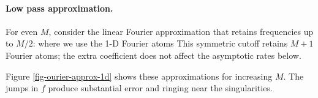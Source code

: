   
\paragraph{Low pass approximation.}

For even $M$, consider the linear Fourier approximation that retains frequencies up to $M/2$:
where we use the 1-D Fourier atoms
This symmetric cutoff retains $M+1$ Fourier atoms; the extra coefficient does not affect the asymptotic rates below.

Figure \ref{fig-ourier-approx-1d} shows these approximations for increasing $M$. The jumps in $f$ produce substantial error and ringing near the singularities.

                                                                                                                                                               


                                       
                                                                                                                                                                                                      

                                          
                                                          